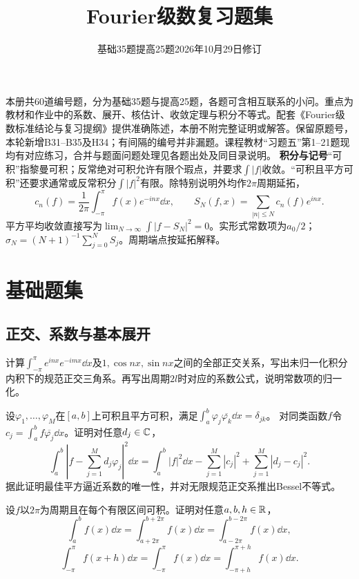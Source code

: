 
\title{Fourier级数复习题集}
\author{}
\date{基础35题\quad 提高25题\qquad 2026年10月29日修订}

\maketitle
本册共60道编号题，分为基础35题与提高25题，各题可含相互联系的小问。重点为教材和作业中的系数、展开、核估计、收敛定理与积分不等式。配套《Fourier级数标准结论与复习提纲》提供准确陈述，本册不附完整证明或解答。保留原题号，本轮新增B31--B35及H34；有间隔的编号并非漏题。课程教材“习题五”第1--21题现均有对应练习，合并与题面问题处理见各题出处及同目录说明。
\sources
\noindent\textbf{积分与记号}\quad “可积”指黎曼可积；反常绝对可积允许有限个瑕点，并要求$\int|f|$收敛。“可积且平方可积”还要求通常或反常积分$\int|f|^2$有限。除特别说明外均作$2\pi$周期延拓，
\[
 c_n(f)=\frac1{2\pi}\int_{-\pi}^{\pi}f(x)e^{-inx}\dd x,\qquad
 S_N(f,x)=\sum_{|n|\le N}c_n(f)e^{inx}.
\]
平方平均收敛直接写为$\lim_{N\to\infty}\int|f-S_N|^2=0$。实形式常数项为$a_0/2$；$\sigma_N=(N+1)^{-1}\sum_{j=0}^NS_j$。周期端点按延拓解释。
\clearpage
\tableofcontents
\clearpage
\section{基础题集}
\subsection*{正交、系数与基本展开}

计算$\int_{-\pi}^{\pi}e^{inx}e^{-imx}\dd x$及$1,\cos nx,\sin nx$之间的全部正交关系，写出未归一化积分内积下的规范正交三角系。再写出周期$2l$时对应的系数公式，说明常数项的归一化。

设$\varphi_1,\ldots,\varphi_M$在$[a,b]$上可积且平方可积，满足$\int_a^b\varphi_j\overline{\varphi_k}\dd x=\delta_{jk}$。
对同类函数$f$令$c_j=\int_a^bf\overline{\varphi_j}\dd x$。证明对任意$d_j\in\mathbb C$，
\[
 \int_a^b\left|f-\sum_{j=1}^Md_j\varphi_j\right|^2\dd x
 =\int_a^b|f|^2\dd x-\sum_{j=1}^M|c_j|^2+\sum_{j=1}^M|d_j-c_j|^2.
\]
据此证明最佳平方逼近系数的唯一性，并对无限规范正交系推出Bessel不等式。

设$f$以$2\pi$为周期且在每个有限区间可积。证明对任意$a,b,h\in\mathbb R$，
\[
 \int_a^bf(x)\dd x=\int_{a+2\pi}^{b+2\pi}f(x)\dd x
 =\int_{a-2\pi}^{b-2\pi}f(x)\dd x,
\]
\[
 \int_{-\pi}^{\pi}f(x+h)\dd x=\int_{-\pi}^{\pi}f(x)\dd x
 =\int_{-\pi+h}^{\pi+h}f(x)\dd x.
\]

